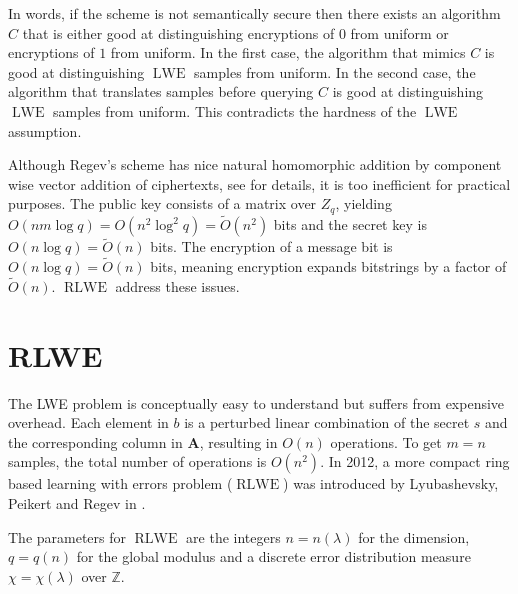 In words, if the scheme is not semantically secure then there exists an algorithm $C$ that is either good at distinguishing encryptions of $0$ from uniform or encryptions of $1$ from uniform. In the first case, the algorithm that mimics $C$ is good at distinguishing $\operatorname{LWE}$ samples from uniform. In the second case, the algorithm that translates samples before querying $C$ is good at distinguishing $\operatorname{LWE}$ samples from uniform. This contradicts the hardness of the $\operatorname{LWE}$ assumption.

Although Regev's scheme has nice natural homomorphic addition by component wise vector addition of ciphertexts, see \cite[pp. 36]{Pei16-decade} for details, it is too inefficient for practical purposes. The public key consists of a matrix over $Z_q$, yielding $O(nm \log q) = O(n^2 \log^2 q) = \tilde{O}(n^2)$ bits and the secret key is $O(n \log q) = \tilde{O}(n)$ bits. The encryption of a message bit is $O(n \log q) = \tilde{O}(n)$ bits, meaning encryption expands bitstrings by a factor of $\tilde{O}(n)$. $\operatorname{RLWE}$ address these issues.

\section{RLWE}
The LWE problem is conceptually easy to understand but suffers from expensive overhead. Each element in $b$ is a perturbed linear combination of the secret $s$ and the corresponding column in $\textbf{A}$, resulting in $O(n)$ operations. To get $m = n$ samples, the total number of operations is $O(n^2)$. In 2012, a more compact ring based learning with errors problem ($\operatorname{RLWE}$) was introduced by Lyubashevsky, Peikert and Regev in \cite{RLWE}.

The parameters for $\operatorname{RLWE}$ are the integers $n = n(\lambda)$ for the dimension, $q = q(n)$ for the global modulus and a discrete error distribution measure $\chi = \chi(\lambda)$ over $\mathbb{Z}$.

